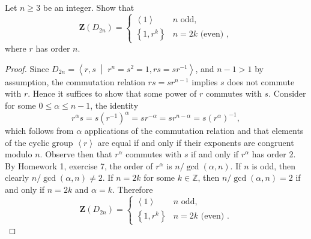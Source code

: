 \documentclass[10pt]{amsart}
\newcommand{\cntr}[1]{\mathbf{Z}\left(#1\right)}
\begin{document}
\begin{thm}
  Let $n \geq 3$ be an integer.
  Show that 
  $$\cntr{D_{2n}} = \left\{\begin{array}{ll}
  \left<1\right> & n \text{ odd},\\
  \left\{1, r^k\right\} & n = 2k \text{ (even) },
  \end{array}\right.$$
  where $r$ has order $n$.
  \begin{proof}
    Since $D_{2n} = \left<r,s \;\middle\vert\; r^n = s^2 = 1, rs = sr^{-1} \right>$, and $n - 1 > 1$ by assumption, the commutation relation $rs = sr^{n-1}$ implies $s$ does not commute with $r$.
    Hence it suffices to show that some power of $r$ commutes with $s$.
    Consider for some $0 \leq \alpha \leq n-1$, the identity 
    $$r^\alpha s = s(r^{-1})^\alpha = sr^{-\alpha} = sr^{n-\alpha} = s(r^\alpha)^{-1},$$
    which follows from $\alpha$ applications of the commutation relation and that elements of the cyclic group $\left<r\right>$ are equal if and only if their exponents are congruent modulo $n$.
    Observe then that $r^\alpha$ commutes with $s$ if and only if $r^\alpha$ has order 2.
    By Homework 1, exercise 7, the order of $r^\alpha$ is $n/\gcd(\alpha,n)$.
    If $n$ is odd, then clearly $n/\gcd(\alpha,n) \not = 2$.
    If $n = 2k$ for some $k \in \mathbb{Z}$, then $n/\gcd(\alpha,n)= 2$ if and only if $n = 2k$ and $\alpha = k$.
    Therefore   
    $$\cntr{D_{2n}} = \left\{\begin{array}{ll}
    \left<1\right> & n \text{ odd},\\
    \left\{1, r^k\right\} & n = 2k \text{ (even) }.
    \end{array}\right.$$
  \end{proof}
\end{thm}
\end{document}
